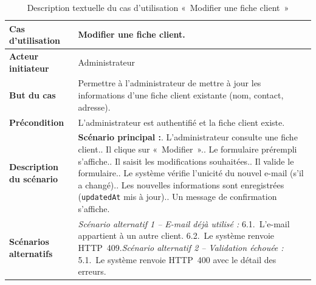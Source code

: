 \begin{table}[H]
  \caption{Description textuelle du cas d'utilisation «~Modifier une fiche client~»}
  \label{tab:cu-modifier-client}
  \centering
  \begin{tabularx}{\textwidth}{|L{3.8cm}|X|}
    \hline
    \textbf{Cas d'utilisation} & Modifier une fiche client. \\
    \hline
    \textbf{Acteur initiateur} & Administrateur \\
    \hline
    \textbf{But du cas} & Permettre à l'administrateur de mettre à jour les informations d'une fiche client existante (nom, contact, adresse). \\
    \hline
    \textbf{Précondition} & L'administrateur est authentifié et la fiche client existe. \\
    \hline
    \textbf{Description du scénario} &
    \textbf{Scénario principal :}. L'administrateur consulte une fiche client.. Il clique sur «~Modifier~».. Le formulaire prérempli s'affiche.. Il saisit les modifications souhaitées.. Il valide le formulaire.. Le système vérifie l'unicité du nouvel e-mail (s'il a changé).. Les nouvelles informations sont enregistrées (\texttt{updatedAt} mis à jour).. Un message de confirmation s'affiche.\\
    \hline
    \textbf{Scénarios alternatifs} &
    \textit{Scénario alternatif 1 -- E-mail déjà utilisé :}\newline
    \hspace*{6pt}6.1.~L'e-mail appartient à un autre client.\newline
    \hspace*{6pt}6.2.~Le système renvoie HTTP~409.\newline[2pt]
    \textit{Scénario alternatif 2 -- Validation échouée :}\newline
    \hspace*{6pt}5.1.~Le système renvoie HTTP~400 avec le détail des erreurs.\\
    \hline
  \end{tabularx}
\end{table}

